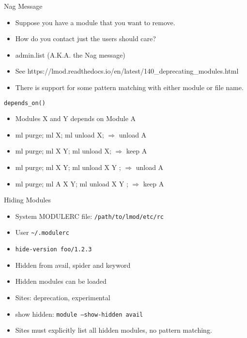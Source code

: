 \documentclass{beamer}
\begin{document}
\begin{frame}{Nag Message}
  \begin{itemize}
    \item Suppose you have a module that you want to remove.
    \item How do you contact just the users should care?
    \item admin.list (A.K.A. the Nag message)
    \item See https://lmod.readthedocs.io/en/latest/140\_deprecating\_modules.html
    \item There is support for some pattern matching with either
      module or file name.
  \end{itemize}
\end{frame}

\begin{frame}{\texttt{depends\_on()}}
  \begin{itemize}
    \item Modules X and Y depends on Module A
    \item ml purge; ml X; ml unload X;      $\Rightarrow$ unload A
    \item ml purge; ml X Y; ml unload X;    $\Rightarrow$ keep A
    \item ml purge; ml X Y; ml unload X Y ; $\Rightarrow$ unload A
    \item ml purge; ml A X Y; ml unload X Y ; $\Rightarrow$ keep A
  \end{itemize}
\end{frame}

\begin{frame}{Hiding Modules}
  \begin{itemize}
    \item System MODULERC file: \texttt{/path/to/lmod/etc/rc}
    \item User \texttt{\textasciitilde/.modulerc}
    \item \texttt{\color{blue}hide-version foo/1.2.3}
    \item Hidden from avail, spider and keyword
    \item Hidden modules can be loaded
    \item Sites: deprecation, experimental
    \item show hidden: \texttt{module --show-hidden avail}
    \item Sites must explicitly list all hidden modules, no pattern matching.
  \end{itemize}
\end{frame}
\end{document}
